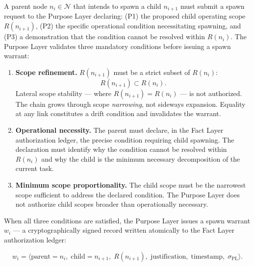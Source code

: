 \begin{dfn}
\label{dfn:purpose-authorization}
A parent node $n_i \in \mathcal{N}$ that intends to spawn a child $n_{i+1}$ must submit a spawn request to the Purpose Layer declaring: (P1) the proposed child operating scope $R(n_{i+1})$, (P2) the specific operational condition necessitating spawning, and (P3) a demonstration that the condition cannot be resolved within $R(n_i)$. The Purpose Layer validates three mandatory conditions before issuing a spawn warrant:

\begin{enumerate}
    \item[(P1)] \textbf{Scope refinement.} $R(n_{i+1})$ must be a strict subset of $R(n_i)$:
    \begin{equation}
    R(n_{i+1}) \subset R(n_i).
    \label{eq:scope-refinement}
    \end{equation}
    Lateral scope stability — where $R(n_{i+1}) = R(n_i)$ — is not authorized. The chain grows through scope \emph{narrowing}, not sideways expansion. Equality at any link constitutes a drift condition and invalidates the warrant.

    \item[(P2)] \textbf{Operational necessity.} The parent must declare, in the Fact Layer authorization ledger, the precise condition requiring child spawning. The declaration must identify why the condition cannot be resolved within $R(n_i)$ and why the child is the minimum necessary decomposition of the current task.

    \item[(P3)] \textbf{Minimum scope proportionality.} The child scope must be the narrowest scope sufficient to address the declared condition. The Purpose Layer does not authorize child scopes broader than operationally necessary.
\end{enumerate}
\end{dfn}

When all three conditions are satisfied, the Purpose Layer issues a spawn warrant $w_i$ — a cryptographically signed record written atomically to the Fact Layer authorization ledger:

\begin{equation}
w_i = \bigl\langle
\text{parent}=n_i,\;
\text{child}=n_{i+1},\;
R(n_{i+1}),\;
\text{justification},\;
\text{timestamp},\;
\sigma_{\text{PL}}
\bigr\rangle .
\label{eq:spawn-warrant}
\end{equation}

